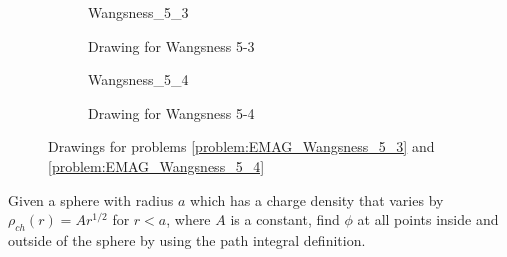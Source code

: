 \documentclass[crop=false,class=book,oneside]{standalone}
\begin{document}
            \begin{figure}[H]
                \centering
                \captionsetup{type=figure}
                \begin{subfigure}[b]{0.49\textwidth}
                    \centering
                    {Wangsness_5_3}
                    \caption{Drawing for Wangsness 5-3}
                    \label{fig:EMAG_Wangsness_5_3}
                \end{subfigure}
                \begin{subfigure}[b]{0.49\textwidth}
                    \centering
                    {Wangsness_5_4}
                    \caption{Drawing for Wangsness 5-4}
                    \label{fig:EMAG_Wangsness_5_4}
                \end{subfigure}
                \caption{%
                    Drawings for problems
                    \ref{problem:EMAG_Wangsness_5_3}
                    and
                    \ref{problem:EMAG_Wangsness_5_4}
                }
            \end{figure}
            \begin{problem}[Wangsness 5-10]
                Given a sphere with radius $a$ which has
                a charge density that varies by
                $\rho_{ch}(r)=Ar^{1/2}$ for $r<a$, where $A$
                is a constant, find $\phi$ at all points inside
                and outside of the sphere by using the path
                integral definition.
            \end{problem}
\end{document}
